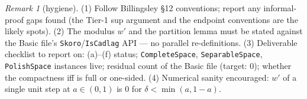 \documentclass[11pt]{article}
\theoremstyle{plain}
\theoremstyle{remark}
\newtheorem{remark}{Remark}
\begin{document}
\begin{remark}[hygiene]
(1) Follow Billingsley \S12 conventions; report any informal-proof gaps found
(the Tier-1 sup argument and the endpoint conventions are the likely spots).
(2) The modulus $w'$ and the partition lemma must be stated against the
Basic file's \texttt{Skoro}/\texttt{IsCadlag} API --- no parallel
re-definitions.
(3) Deliverable checklist to report on: (a)--(f) status;
\texttt{CompleteSpace}, \texttt{SeparableSpace}, \texttt{PolishSpace}
instances live; residual count of the Basic file (target: 0); whether the
compactness iff is full or one-sided.
(4) Numerical sanity encouraged: $w'$ of a single unit step at $a\in(0,1)$ is
$0$ for $\delta<\min(a,1-a)$.
\end{remark}
\end{document}
